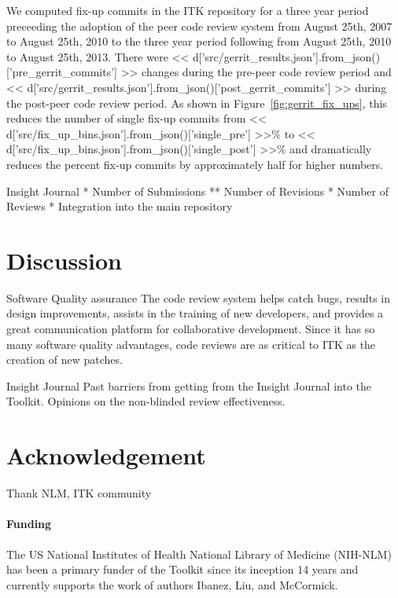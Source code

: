 \documentclass{frontiersENG} %
\begin{document}
\begin{enumeruate}
We computed fix-up commits in the ITK repository for a three year period
preceeding the adoption of the peer code review system from August 25th, 2007
to August 25th, 2010 to the three year period following from August 25th, 2010
to August 25th, 2013.  There were
<< d['src/gerrit_results.json'].from_json()['pre_gerrit_commits'] >>
changes during the pre-peer code review period and
<< d['src/gerrit_results.json'].from_json()['post_gerrit_commits'] >>
during the post-peer code review period.  As shown in
Figure~\ref{fig:gerrit_fix_ups}, this reduces the number of
single fix-up commits from <<
d['src/fix_up_bins.json'].from_json()['single_pre'] >>\%
to << d['src/fix_up_bins.json'].from_json()['single_post'] >>\% and
dramatically reduces the percent fix-up commits by approximately half for
higher numbers.

Insight Journal
* Number of Submissions
** Number of Revisions
* Number of Reviews
* Integration into the main repository


\section{Discussion}
Software Quality assurance
The code review system helps catch bugs, results in design improvements, assists in the training of new developers, and provides a great communication platform for collaborative development. Since it has so many software quality advantages, code reviews are as critical to ITK as the creation of new patches.


Insight Journal
Past barriers from getting from the Insight Journal into the Toolkit.  Opinions on the
non-blinded review effectiveness.



\section*{Acknowledgement}
Thank NLM, ITK community


\paragraph{Funding\textcolon} The US National Institutes of Health National Library of Medicine (NIH-NLM) has been a primary funder of the Toolkit since its inception 14 years and currently supports the work of authors Ibanez, Liu, and McCormick.





\end{enumeruate}
\end{document}
